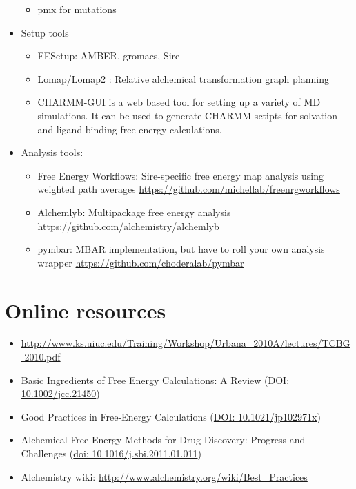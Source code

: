 \documentclass[9pt,bestpractices]{livecoms}
\begin{document}
\begin{itemize}
\begin{itemize}
	\item pmx for mutations
	\end{itemize}
\item Setup tools
	\begin{itemize}
	\item FESetup: AMBER, gromacs, Sire
	\item Lomap/Lomap2 : Relative alchemical transformation graph planning
	\item CHARMM-GUI is a web based tool for setting up a variety of MD simulations. It can be used to generate CHARMM sctipts for solvation and ligand-binding free energy calculations.
	\end{itemize}
\item Analysis tools:
	\begin{itemize}
	\item Free Energy Workflows: Sire-specific free energy map analysis using weighted path averages
	\url{https://github.com/michellab/freenrgworkflows}
	\item Alchemlyb: Multipackage free energy analysis
	\url{https://github.com/alchemistry/alchemlyb}
	\item pymbar: MBAR implementation, but have to roll your own analysis wrapper
	\url{https://github.com/choderalab/pymbar}
	\end{itemize}
\end{itemize}

\section{Online resources}
\begin{itemize}
\item \url{http://www.ks.uiuc.edu/Training/Workshop/Urbana_2010A/lectures/TCBG-2010.pdf}
\item Basic Ingredients of Free Energy Calculations: A Review (\url{DOI: 10.1002/jcc.21450})
\item Good Practices in Free-Energy Calculations (\url{DOI: 10.1021/jp102971x})
\item Alchemical Free Energy Methods for Drug Discovery: Progress and Challenges (\url{doi: 10.1016/j.sbi.2011.01.011})
\item Alchemistry wiki: \url{http://www.alchemistry.org/wiki/Best_Practices}
\end{itemize}

\clearpage
\end{document}
